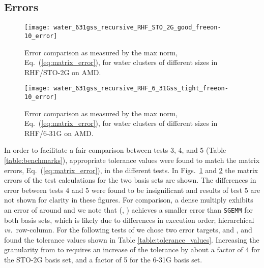 \subsection{Errors}

\begin{figure}
\texttt{[image: water\_631gss\_recursive\_RHF\_STO\_2G\_good\_freeon-10\_error]}
\caption{\label{fig:water_631gss_RHF_STO_2G_good_error_AMD} Error comparison as
measured by the max norm, Eq.~(\ref{eq:matrix_error}), for water clusters of
different sizes in RHF/STO-2G on AMD.}
\end{figure}

\begin{figure}
\texttt{[image: water\_631gss\_recursive\_RHF\_6\_31Gss\_tight\_freeon-10\_error]}
\caption{\label{fig:water_631gss_RHF_6_31Gss_tight_error_AMD} Error comparison
as measured by the max norm, Eq.~(\ref{eq:matrix_error}), for water clusters of
different sizes in RHF/6-31G on AMD.}
\end{figure}

In order to facilitate a fair comparison between tests 3, 4, and 5
(Table \ref{table:benchmarks}), appropriate tolerance values were found to
match the matrix errors, Eq.~(\ref{eq:matrix_error}), in the different tests.
In Figs.~\ref{fig:water_631gss_RHF_STO_2G_good_error_AMD} and
\ref{fig:water_631gss_RHF_6_31Gss_tight_error_AMD} the matrix errors of the
test calculations for the two basis sets are shown. The differences in error
between tests 4 and 5 were found to be insignificant and results of test 5 are
not shown for clarity in these figures.  For comparison, a dense multiply
exhibits an error of around  and we note that \SpAMM{}(,
) achieves a smaller error than {\tt SGEMM} for both basis sets,
which is likely due to differences in execution order; hierarchical
\emph{vs.}~row-column.  For the following tests of \SpAMM{} we chose two error
targets,  and , and found the tolerance values shown in
Table \ref{table:tolerance_values}. Increasing the granularity from  to  requires an increase of the tolerance by about a factor
of 4 for the STO-2G basis set, and a factor of 5 for the 6-31G basis
set.

